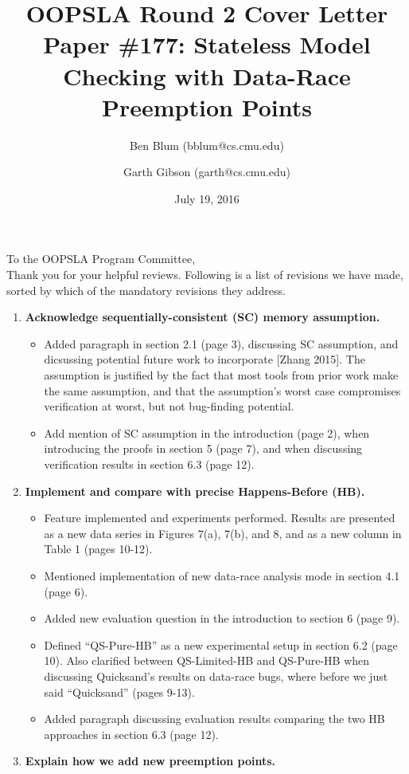 \documentclass{article}
\title{OOPSLA Round 2 Cover Letter \\ {\large Paper \#177: Stateless Model Checking with Data-Race Preemption Points}}
\author{Ben Blum (\textsf{bblum@cs.cmu.edu}) \and Garth Gibson (\textsf{garth@cs.cmu.edu})}
\date{July 19, 2016}
\begin{document}
\maketitle
\thispagestyle{empty}

\noindent To the OOPSLA Program Committee,
\\

Thank you for your helpful reviews. Following is a list of revisions we have made, sorted by which of the mandatory revisions they address.

\begin{enumerate}
	\item {\bf Acknowledge sequentially-consistent (SC) memory assumption.}
	\begin{itemize}
		\item Added paragraph in section 2.1 (page 3), discussing SC assumption, and dicsussing potential future work to incorporate [Zhang 2015]. The assumption is justified by the fact that most tools from prior work make the same assumption, and that the assumption's worst case compromises verification at worst, but not bug-finding potential.
		\item Add mention of SC assumption in the introduction (page 2),
		when introducing the proofs in section 5 (page 7),
		and when discussing verification results in section 6.3 (page 12).
	\end{itemize}
	\item {\bf Implement and compare with precise Happens-Before (HB).}
	\begin{itemize}
		\item Feature implemented and experiments performed. Results are presented as a new data series in Figures 7(a), 7(b), and 8, and as a new column in Table 1 (pages 10-12).
		\item Mentioned implementation of new data-race analysis mode in section 4.1 (page 6).
		\item Added new evaluation question in the introduction to section 6 (page 9).
		\item Defined ``QS-Pure-HB'' as a new experimental setup in section 6.2 (page 10). Also clarified between QS-Limited-HB and QS-Pure-HB when discussing Quicksand's results on data-race bugs, where before we just said ``Quicksand'' (pages 9-13).
		\item Added paragraph discussing evaluation results comparing the two HB approaches in section 6.3 (page 12).
	\end{itemize}
	\item {\bf Explain how we add new preemption points.}

\end{enumerate}
\end{document}
